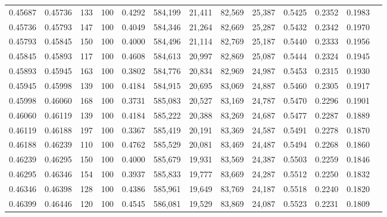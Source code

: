 \begin{tabular}{rrrrrrrrrrrrr}
0.45687 & 0.45736 &   133 & 100 &                                     0.4292 & 584,199 &  21,411 &  82,569 &  25,387 & 0.5425 & 0.2352 & 0.1983 \\
0.45736 & 0.45793 &   147 & 100 &                                     0.4049 & 584,346 &  21,264 &  82,669 &  25,287 & 0.5432 & 0.2342 & 0.1970 \\
0.45793 & 0.45845 &   150 & 100 &                                     0.4000 & 584,496 &  21,114 &  82,769 &  25,187 & 0.5440 & 0.2333 & 0.1956 \\
0.45845 & 0.45893 &   117 & 100 &                                     0.4608 & 584,613 &  20,997 &  82,869 &  25,087 & 0.5444 & 0.2324 & 0.1945 \\
0.45893 & 0.45945 &   163 & 100 &                                     0.3802 & 584,776 &  20,834 &  82,969 &  24,987 & 0.5453 & 0.2315 & 0.1930 \\
0.45945 & 0.45998 &   139 & 100 &                                     0.4184 & 584,915 &  20,695 &  83,069 &  24,887 & 0.5460 & 0.2305 & 0.1917 \\
0.45998 & 0.46060 &   168 & 100 &                                     0.3731 & 585,083 &  20,527 &  83,169 &  24,787 & 0.5470 & 0.2296 & 0.1901 \\
0.46060 & 0.46119 &   139 & 100 &                                     0.4184 & 585,222 &  20,388 &  83,269 &  24,687 & 0.5477 & 0.2287 & 0.1889 \\
0.46119 & 0.46188 &   197 & 100 &                                     0.3367 & 585,419 &  20,191 &  83,369 &  24,587 & 0.5491 & 0.2278 & 0.1870 \\
0.46188 & 0.46239 &   110 & 100 &                                     0.4762 & 585,529 &  20,081 &  83,469 &  24,487 & 0.5494 & 0.2268 & 0.1860 \\
0.46239 & 0.46295 &   150 & 100 &                                     0.4000 & 585,679 &  19,931 &  83,569 &  24,387 & 0.5503 & 0.2259 & 0.1846 \\
0.46295 & 0.46346 &   154 & 100 &                                     0.3937 & 585,833 &  19,777 &  83,669 &  24,287 & 0.5512 & 0.2250 & 0.1832 \\
0.46346 & 0.46398 &   128 & 100 &                                     0.4386 & 585,961 &  19,649 &  83,769 &  24,187 & 0.5518 & 0.2240 & 0.1820 \\
0.46399 & 0.46446 &   120 & 100 &                                     0.4545 & 586,081 &  19,529 &  83,869 &  24,087 & 0.5523 & 0.2231 & 0.1809 \\

\end{tabular}
